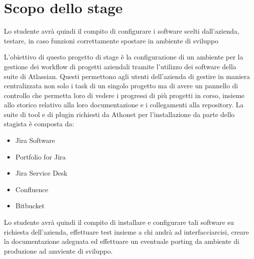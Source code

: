 \section*{Scopo dello stage}
Lo studente avrà quindi il compito di configurare i software scelti dall'azienda, testare, in caso funzioni correttamente spostare in ambiente di sviluppo


L'obiettivo di questo progetto di stage è la configurazione di un ambiente per la gestione dei workflow di progetti aziendali tramite l'utilizzo dei software della suite di Atlassian.
Questi permettono agli utenti dell'azienda di gestire in maniera centralizzata non solo i task di un singolo progetto ma di avere un pannello di controllo che permetta loro di vedere i progressi di più progetti in corso, insieme allo storico relativo alla loro documentazione e i collegamenti alla repository.
La suite di tool e di plugin richiesti da Athonet per l'installazione da parte dello stagista è composta da:
\begin{itemize}
	\item Jira Software
	\item Portfolio for Jira
	\item Jira Service Desk
	\item Confluence
	\item Bitbucket
\end{itemize}
Lo studente avrà quindi il compito di installare e configurare tali software su richiesta dell'azienda, effettuare test insieme a chi andrà ad interfacciarcisi, creare la documentazione adeguata ed effettuare un eventuale porting da ambiente di produzione ad amviente di sviluppo.
